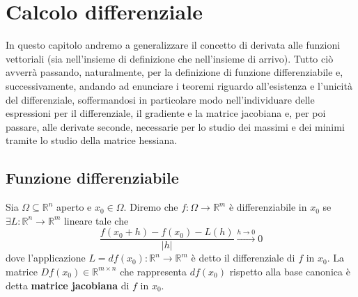 \chapter{Calcolo differenziale}
\pagestyle{plain}
\thispagestyle{empty}
\pagestyle{fancy}
In questo capitolo andremo a generalizzare il concetto di derivata  alle funzioni vettoriali (sia nell'insieme di definizione che nell'insieme di arrivo). Tutto ciò avverrà passando, naturalmente, per la definizione di funzione differenziabile e, successivamente, andando ad enunciare i teoremi riguardo all'esistenza e l'unicità del differenziale, soffermandosi in particolare modo nell'individuare delle espressioni per il differenziale, il gradiente e la matrice jacobiana e, per poi passare, alle derivate seconde, necessarie per lo studio dei massimi e dei minimi tramite lo studio della matrice hessiana. 

\section{Funzione differenziabile}

\begin{definition}[\textcolor{blue}{funzione differenziabile in un punto e matrice jacobiana}]
Sia $\Omega \subseteq \mathbb{R}^n$ aperto e $x_0 \in \Omega$. Diremo che $f: \Omega \to \mathbb{R}^m$ è differenziabile in $x_0$ se $\exists L: \mathbb{R}^n \to \mathbb{R}^m$ lineare tale che
$$
\frac{f(x_0 + h)-f(x_0) - L(h)}{|h|} \stackrel{h \to 0}{\to} 0
$$
dove l'applicazione $L = df(x_0): \mathbb{R}^n \to \mathbb{R}^m$ è detto il differenziale di $f$ in $x_0$. La matrice $Df(x_0) \in \mathbb{R}^{m \times n}$ che rappresenta $df(x_0)$ rispetto alla base canonica è detta \textbf{matrice jacobiana} di $f$ in $x_0$.
\end{definition}

